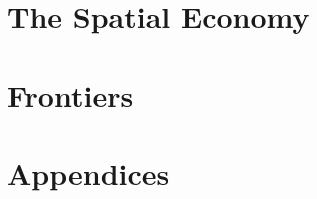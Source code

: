 \documentclass[12pt, a4paper, oneside, openany]{book}
\begin{document}
\part{The Spatial Economy}\label{part3}




\part{Frontiers}\label{part4}



\appendix
\part*{Appendices}


\backmatter
\printindex
\end{document}
